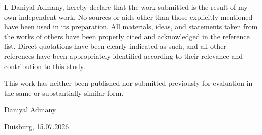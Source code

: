 \documentclass[
]{article}
\begin{document}
I, Daniyal Admany, hereby declare that the work submitted is the result of my own independent work. No sources or aids other than those explicitly mentioned have been used in its preparation. All materials, ideas, and statements taken from the works of others have been properly cited and acknowledged in the reference list. Direct quotations have been clearly indicated as such, and all other references have been appropriately identified according to their relevance and contribution to this study.

This work has neither been published nor submitted previously for evaluation in the same or substantially similar form.

\vfill

Daniyal Admany

Duisburg, 15.07.2026
\vspace{2cm}
\end{document}
